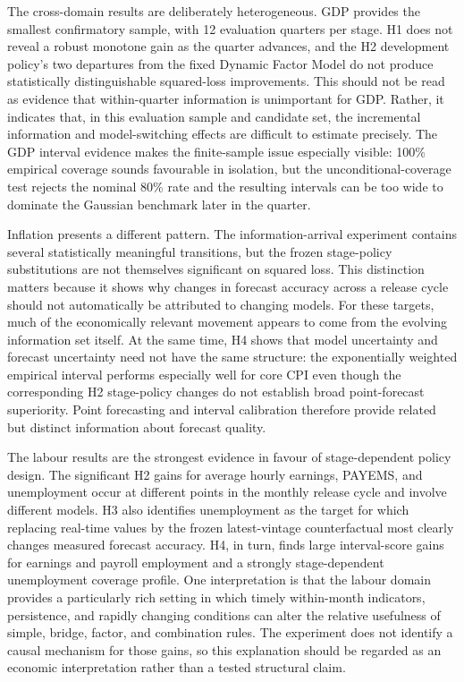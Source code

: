 The cross-domain results are deliberately heterogeneous.  GDP provides the
smallest confirmatory sample, with 12 evaluation quarters per stage.  H1 does
not reveal a robust monotone gain as the quarter advances, and the H2
development policy's two departures from the fixed Dynamic Factor Model do not
produce statistically distinguishable squared-loss improvements.  This should
not be read as evidence that within-quarter information is unimportant for GDP.
Rather, it indicates that, in this evaluation sample and candidate set, the
incremental information and model-switching effects are difficult to estimate
precisely.  The GDP interval evidence makes the finite-sample issue especially
visible: 100\% empirical coverage sounds favourable in isolation, but the
unconditional-coverage test rejects the nominal 80\% rate and the resulting
intervals can be too wide to dominate the Gaussian benchmark later in the
quarter.

Inflation presents a different pattern.  The information-arrival experiment
contains several statistically meaningful transitions, but the frozen
stage-policy substitutions are not themselves significant on squared loss.
This distinction matters because it shows why changes in forecast accuracy
across a release cycle should not automatically be attributed to changing
models.  For these targets, much of the economically relevant movement appears
to come from the evolving information set itself.  At the same time, H4 shows
that model uncertainty and forecast uncertainty need not have the same
structure: the exponentially weighted empirical interval performs especially
well for core CPI even though the corresponding H2 stage-policy changes do not
establish broad point-forecast superiority.  Point forecasting and interval
calibration therefore provide related but distinct information about forecast
quality.

The labour results are the strongest evidence in favour of stage-dependent
policy design.  The significant H2 gains for average hourly earnings,
PAYEMS, and unemployment occur at different points in the monthly release
cycle and involve different models.  H3 also identifies unemployment as the
target for which replacing real-time values by the frozen latest-vintage
counterfactual most clearly changes measured forecast accuracy.  H4, in turn,
finds large interval-score gains for earnings and payroll employment and a
strongly stage-dependent unemployment coverage profile.  One interpretation
is that the labour domain provides a particularly rich setting in which timely
within-month indicators, persistence, and rapidly changing conditions can
alter the relative usefulness of simple, bridge, factor, and combination
rules.  The experiment does not identify a causal mechanism for those gains,
so this explanation should be regarded as an economic interpretation rather
than a tested structural claim.

